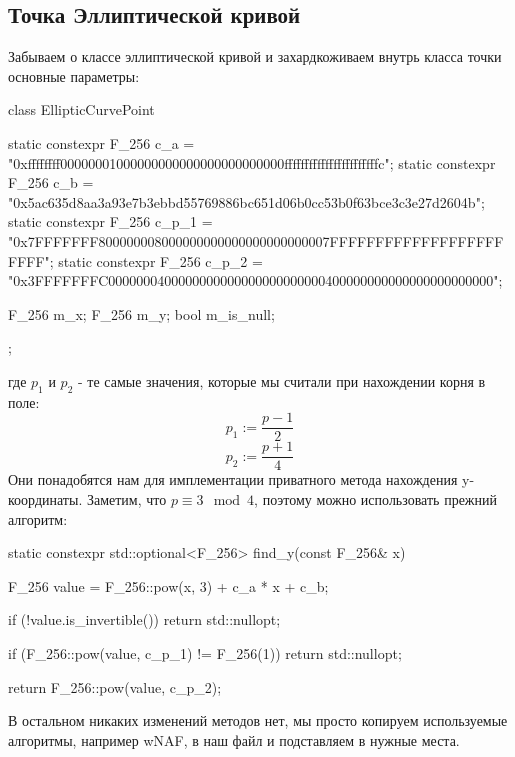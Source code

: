 \subsection{Точка Эллиптической кривой}
Забываем о классе эллиптической кривой и захардкоживаем внутрь класса точки основные параметры:
\begin{cppcode}
class EllipticCurvePoint {
    static constexpr F_256 c_a = "0xffffffff00000001000000000000000000000000fffffffffffffffffffffffc";
    static constexpr F_256 c_b = "0x5ac635d8aa3a93e7b3ebbd55769886bc651d06b0cc53b0f63bce3c3e27d2604b";
    static constexpr F_256 c_p_1 = "0x7FFFFFFF800000008000000000000000000000007FFFFFFFFFFFFFFFFFFFFFFF";
    static constexpr F_256 c_p_2 = "0x3FFFFFFFC0000000400000000000000000000000400000000000000000000000";

    F_256 m_x;
    F_256 m_y;
    bool m_is_null;
};
\end{cppcode}
где $p_1$ и $p_2$ - те самые значения, которые мы считали при нахождении корня в поле:
\[p_1:=\frac{p-1}{2}\]
\[p_2:=\frac{p+1}{4}\]
Они понадобятся нам для имплементации приватного метода нахождения y-координаты. Заметим, что $p\equiv 3\mod 4$, поэтому можно использовать прежний алгоритм:
\begin{cppcode}
static constexpr std::optional<F_256> find_y(const F_256& x) {
    F_256 value = F_256::pow(x, 3) + c_a * x + c_b;

    if (!value.is_invertible()) {
        return std::nullopt;
    }

    if (F_256::pow(value, c_p_1) != F_256(1)) {
        return std::nullopt;
    }

    return F_256::pow(value, c_p_2);
}
\end{cppcode}
В остальном никаких изменений методов нет, мы просто копируем используемые алгоритмы, например wNAF, в наш файл и подставляем в нужные места.
